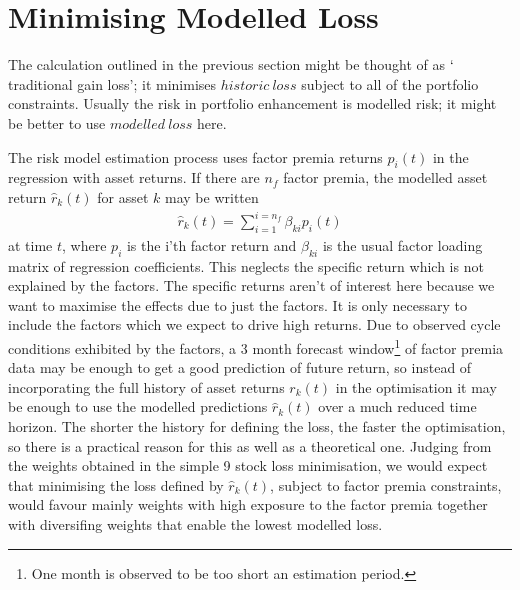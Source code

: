 \documentclass[12pt]{article}
\begin{document}
\section{Minimising Modelled Loss}
The calculation outlined in the previous section might be thought of as $`$traditional gain loss'; it
minimises $historic\ loss$ subject to all of the portfolio constraints. Usually the risk in 
portfolio enhancement is modelled risk; it might be better to use $modelled\ loss$ here.

The risk model estimation process uses factor premia returns $p_{i}(t)$ in the regression
with asset returns. If there are $n_f$ factor premia, the modelled asset return $\hat{r}_{k}(t)$ for asset $k$ may be written
\begin{eqnarray}
    \hat{r}_{k}(t) = \sum_{i=1}^{i=n_f}\beta_{ki} p_{i}(t)
\end{eqnarray}
at time $t$, where $p_i$ is the i'th factor return and $\beta_{ki}$ is the usual factor loading matrix of regression coefficients.
This neglects the specific return which is not explained by the factors. The specific returns aren't of interest here because we want 
to maximise the effects due to just the factors. It is only necessary to include the factors which we expect 
to drive high returns.
Due to observed cycle conditions exhibited by the factors, a 3 month forecast window\footnote{One month is observed to be too short an estimation period.} of factor premia data may be enough
to get a good prediction of future return, so instead of incorporating the full history of
asset returns $r_k(t)$ in the optimisation it may be enough to use the modelled predictions
$\hat{r}_{k}(t)$ over a much reduced time horizon. The shorter the history for defining the
loss, the faster the optimisation, so there is a practical reason for this as well as
a theoretical one. Judging from the weights obtained in the simple 9 stock loss minimisation, we would expect 
that minimising the loss defined by $\hat{r}_{k}(t)$, subject to factor premia constraints, would favour mainly weights 
with high exposure to the factor premia together with diversifing weights that enable the lowest modelled loss.
\end{document}
